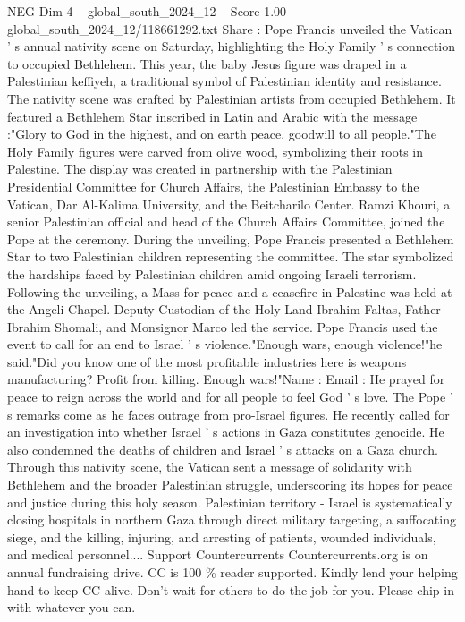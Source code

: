 \begin{textsample}{NEG Dim 4 – global\_south\_2024\_12 – Score 1.00 – global\_south\_2024\_12/118661292.txt}  \label{ex:f4_neg_209}
Share : Pope Francis unveiled the Vatican ' s annual nativity scene on Saturday, highlighting the Holy Family ' s connection to occupied Bethlehem.
This year, the baby Jesus figure was draped in a Palestinian keffiyeh, a traditional symbol of Palestinian identity and resistance.
The nativity scene was crafted by Palestinian artists from occupied Bethlehem.
It featured a Bethlehem Star inscribed in Latin and Arabic with the message :"Glory to God in the highest, and on earth peace, goodwill to all people."The Holy Family figures were carved from olive wood, symbolizing their roots in Palestine.
The display was created in partnership with the Palestinian Presidential Committee for Church Affairs, the Palestinian Embassy to the Vatican, Dar Al-Kalima University, and the Beitcharilo Center.
Ramzi Khouri, a senior Palestinian official and head of the Church Affairs Committee, joined the Pope at the ceremony.
During the unveiling, Pope Francis presented a Bethlehem Star to two Palestinian children representing the committee.
The star symbolized the hardships faced by Palestinian children amid ongoing Israeli terrorism.
Following the unveiling, a Mass for peace and a ceasefire in Palestine was held at the Angeli Chapel.
Deputy Custodian of the Holy Land Ibrahim Faltas, Father Ibrahim Shomali, and Monsignor Marco led the service.
Pope Francis used the event to call for an end to Israel ' s violence."Enough wars, enough violence!"he said."Did you know one of the most profitable industries here is weapons manufacturing?
Profit from killing.
Enough wars!"Name : Email : He prayed for peace to reign across the world and for all people to feel God ' s love.
The Pope ' s remarks come as he faces outrage from pro-Israel figures.
He recently called for an investigation into whether Israel ' s actions in Gaza constitutes genocide.
He also condemned the deaths of children and Israel ' s attacks on a Gaza church.
Through this nativity scene, the Vatican sent a message of solidarity with Bethlehem and the broader Palestinian struggle, underscoring its hopes for peace and justice during this holy season.
Palestinian territory - Israel is systematically closing hospitals in northern Gaza through direct military targeting, a suffocating siege, and the killing, injuring, and arresting of patients, wounded individuals, and medical personnel....
Support Countercurrents Countercurrents.org is on annual fundraising drive.
CC is 100 \% reader supported.
Kindly lend your helping hand to keep CC alive.
Don't wait for others to do the job for you.
Please chip in with whatever you can.

\end{textsample}
